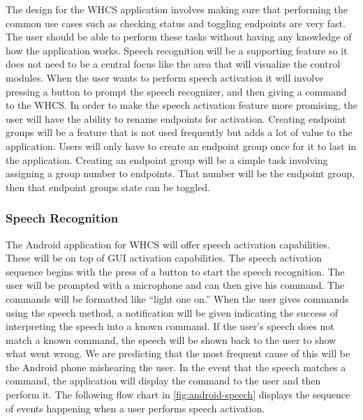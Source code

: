 The design for the WHCS application involves making sure that performing the
common use cases such as checking status and toggling endpoints are very fast.
The user should be able to perform these tasks without having any knowledge of
how the application works. Speech recognition will be a supporting feature so
it does not need to be a central focus like the area that will visualize the
control modules. When the user wants to perform speech activation it will
involve pressing a button to prompt the speech recognizer, and then giving a
command to the WHCS. In order to make the speech activation feature more
promising, the user will have the ability to rename endpoints for activation.
Creating endpoint groups will be a feature that is not used frequently but adds
a lot of value to the application. Users will only have to create an endpoint
group once for it to last in the application. Creating an endpoint group will
be a simple task involving assigning a group number to endpoints. That number
will be the endpoint group, then that endpoint groups state can be toggled.


\subsubsection{Speech Recognition} The Android application for WHCS will offer
speech activation capabilities. These will be on top of GUI activation
capabilities. The speech activation sequence begins with the press of a button
to start the speech recognition. The user will be prompted with a microphone
and can then give his command. The commands will be formatted like {}``light
one on.'' When the user gives commands using the speech method, a notification
will be given indicating the success of interpreting the speech into a known
command. If the user{}'s speech does not match a known command, the speech will
be shown back to the user to show what went wrong. We are predicting that the
most frequent cause of this will be the Android phone mishearing the user. In
the event that the speech matches a command, the application will display the
command to the user and then perform it. The following flow chart in
\autoref{fig:android-speech} displays the sequence of events happening when a
user performs speech activation.


